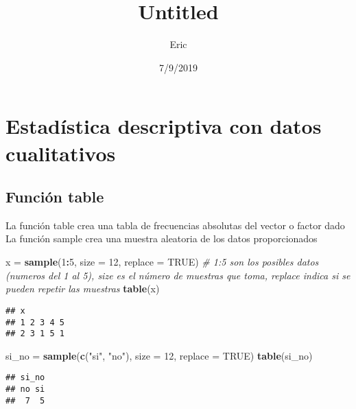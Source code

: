 \documentclass[]{article}
\title{Untitled}
\author{Eric}
\date{7/9/2019}
\newenvironment{Shaded}{\begin{snugshade}}{\end{snugshade}}
\newcommand{\CommentTok}[1]{\textcolor[rgb]{0.56,0.35,0.01}{\textit{#1}}}
\newcommand{\DataTypeTok}[1]{\textcolor[rgb]{0.13,0.29,0.53}{#1}}
\newcommand{\DecValTok}[1]{\textcolor[rgb]{0.00,0.00,0.81}{#1}}
\newcommand{\KeywordTok}[1]{\textcolor[rgb]{0.13,0.29,0.53}{\textbf{#1}}}
\newcommand{\NormalTok}[1]{#1}
\newcommand{\OperatorTok}[1]{\textcolor[rgb]{0.81,0.36,0.00}{\textbf{#1}}}
\newcommand{\OtherTok}[1]{\textcolor[rgb]{0.56,0.35,0.01}{#1}}
\newcommand{\StringTok}[1]{\textcolor[rgb]{0.31,0.60,0.02}{#1}}
\begin{document}
\maketitle

\hypertarget{estadistica-descriptiva-con-datos-cualitativos}{%
\section{Estadística descriptiva con datos
cualitativos}\label{estadistica-descriptiva-con-datos-cualitativos}}

\hypertarget{funcion-table}{%
\subsection{Función table}\label{funcion-table}}

La función table crea una tabla de frecuencias absolutas del vector o
factor dado La función sample crea una muestra aleatoria de los datos
proporcionados

\begin{Shaded}
\begin{Highlighting}[]
\NormalTok{x =}\StringTok{ }\KeywordTok{sample}\NormalTok{(}\DecValTok{1}\OperatorTok{:}\DecValTok{5}\NormalTok{, }\DataTypeTok{size =} \DecValTok{12}\NormalTok{, }\DataTypeTok{replace =} \OtherTok{TRUE}\NormalTok{) }\CommentTok{# 1:5 son los posibles datos (numeros del 1 al 5), size es el número de muestras que toma, replace indica si se pueden repetir las muestras}
\KeywordTok{table}\NormalTok{(x)}
\end{Highlighting}
\end{Shaded}

\begin{verbatim}
## x
## 1 2 3 4 5 
## 2 3 1 5 1
\end{verbatim}

\begin{Shaded}
\begin{Highlighting}[]
\NormalTok{si_no =}\StringTok{ }\KeywordTok{sample}\NormalTok{(}\KeywordTok{c}\NormalTok{(}\StringTok{"si"}\NormalTok{, }\StringTok{"no"}\NormalTok{), }\DataTypeTok{size =} \DecValTok{12}\NormalTok{, }\DataTypeTok{replace =} \OtherTok{TRUE}\NormalTok{)}
\KeywordTok{table}\NormalTok{(si_no)}
\end{Highlighting}
\end{Shaded}

\begin{verbatim}
## si_no
## no si 
##  7  5
\end{verbatim}
\end{document}
